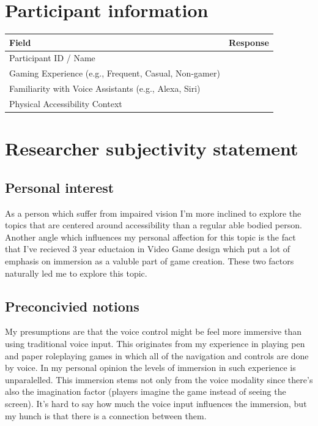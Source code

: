 \section{Participant information}
\begin{table}[h]
\centering
\begin{tabular}{|p{5cm}|p{10cm}|}
\hline
\textbf{Field} & \textbf{Response} \\ \hline
Participant ID / Name & \\[1.5cm] \hline
Gaming Experience (e.g., Frequent, Casual, Non-gamer) & \\[1.5cm] \hline
Familiarity with Voice Assistants (e.g., Alexa, Siri) & \\[1.5cm] \hline
Physical Accessibility Context & \\[2cm] \hline
\end{tabular}
\end{table}


\section{Researcher subjectivity statement}

\subsection{Personal interest}

    As a person which suffer from impaired vision I'm more inclined to explore the topics that are centered around accessibility than a regular able bodied person.
Another angle which influences my personal affection for this topic is the fact that I've recieved 3 year eductaion in Video Game design which put a lot of emphasis on immersion
as a valuble part of game creation. These two factors naturally led me to explore this topic.
\subsection{Preconcivied notions}
My presumptions are that the voice control might be feel more immersive than using traditional voice input. This originates from my experience in playing pen and paper roleplaying 
games in which all of the navigation and controls are done by voice. In my personal opinion the levels of immersion in such experience is unparalelled. This immersion stems not only from the voice 
modality since there's also the imagination factor (players imagine the game instead of seeing the screen). It's hard to say how much the voice input influences the immersion, but my hunch is that there is a connection between them.


